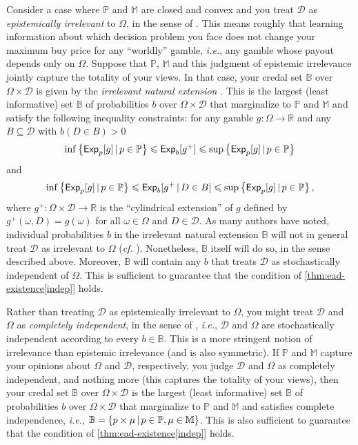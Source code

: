 \documentclass[a4paper,final]{article}
\renewcommand\P{\mathbb{P}} %
\newcommand\Exp{\mathsf{Exp}}
\newcommand{\D}{\mathcal{D}}
\newcommand{\IB}{\mathbb{B}}
\newcommand{\ID}{\mathbb{M}}
\newcommand{\IP}{\P}
\newcommand\SetDelimiter[1][]{
	\nonscript\,#1\vert \allowbreak \nonscript\,\mathopen{}}
\providecommand\given{\SetDelimiter}
\renewcommand{\leq}{\leqslant}
\newenvironment{CCM rewritten}
{\begingroup\color{blue}} %
{\endgroup}              %
\begin{document}
Consider a case where $\IP$ and $\ID$ are closed and convex and you treat $\D$ as \emph{epistemically irrelevant} to $\Omega$, in the sense of \cite{walley1991srip}. This means roughly that learning information about which decision problem you face does not change your maximum buy price for any ``worldly'' gamble, \emph{i.e.}, any gamble whose payout depends only on $\Omega$. Suppose that $\IP$, $\ID$ and this judgment of epistemic irrelevance jointly capture the totality of your views. In that case, your credal set $\IB$ over $\Omega \times \D$ is given by the \emph{irrelevant natural extension}  \citep[see][Thm 13]{cooman2012}. %
This is the largest (least informative) set $\IB$ of probabilities $b$ over $\Omega \times \D$ that marginalize to $\IP$ and $\ID$ and satisfy the following inequality constraints: for any gamble $g:\Omega\rightarrow\mathbb{R}$ and any $B\subseteq\D$ with $b(D\in B)>0$
\[
\inf\left\{\Exp_p[g]\given p\in\IP\right\}\leq\Exp_b[g^+]\leq\sup\left\{\Exp_p[g]\given p\in\IP\right\}
\]
and
\[
\inf\left\{\Exp_p[g]\given p\in\IP\right\}\leq\Exp_b[g^+\given D\in B]\leq\sup\left\{\Exp_p[g]\given p\in\IP\right\},
\]
where $g^+:\Omega\times\D\rightarrow\mathbb{R}$ is the ``cylindrical extension'' of $g$ defined by $g^+(\omega,D)=g(\omega)$ for all $\omega\in\Omega$ and $D\in\D$. As many authors have noted, individual probabilities $b$ in the irrelevant natural extension $\IB$ will not in general treat $\D$ as irrelevant to $\Omega$ (\emph{cf.} \cite[pp. 96-7]{debock2019iar}). Nonetheless, $\IB$ itself will do so, in the sense described above. Moreover, $\IB$ will contain any $b$ that treats $\D$ as stochastically independent of $\Omega$. This is sufficient to guarantee that the condition of \cref{thm:ead-existence[indep]} holds.

Rather than treating $\D$ as epistemically irrelevant to $\Omega$, you might treat $\D$ and $\Omega$ as \emph{completely independent}, in the sense of \cite{seidenfeld2007ci,cozman2012}, \emph{i.e.}, $\D$ and $\Omega$ are stochastically independent according to every $b\in\IB$. This is a more stringent notion of irrelevance than epistemic irrelevance (and is also symmetric). If $\IP$ and $\ID$ capture your opinions about $\Omega$ and $\D$, respectively, you judge $\D$ and $\Omega$ as completely independent, and nothing more (this captures the totality of your views), then your credal set $\IB$ over $\Omega \times \D$ is the largest (least informative) set $\IB$ of probabilities $b$ over $\Omega \times \D$ that marginalize to $\IP$ and $\ID$ and satisfies complete independence, \emph{i.e.}, $\IB=\left\{p\times\mu\given p\in\IP, \mu\in\ID\right\}$. This is also sufficient to guarantee that the condition of \cref{thm:ead-existence[indep]} holds.
\end{document}
